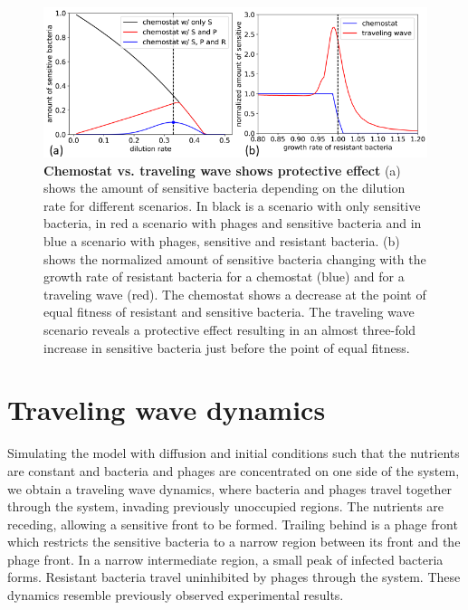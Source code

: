 \begin{figure}
\centering
\includegraphics[width=\linewidth]{graphics/2025_09_26_phages_fig2.png}
\caption{\textbf{Chemostat vs. traveling wave shows protective effect} (a) shows the amount of sensitive bacteria depending on the dilution rate for different scenarios. In black is a scenario with only sensitive bacteria, in red a scenario with phages and sensitive bacteria and in blue a scenario with phages, sensitive and resistant bacteria. (b) shows the normalized amount of sensitive bacteria changing with the growth rate of resistant bacteria for a chemostat (blue) and for a traveling wave (red). The chemostat shows a decrease at the point of equal fitness of resistant and sensitive bacteria. The traveling wave scenario reveals a protective effect resulting in an almost three-fold increase in sensitive bacteria just before the point of equal fitness.}
\label{fig:results_chemostat_traveling_wave}
\end{figure}

\section{Traveling wave dynamics}
Simulating the model with diffusion and initial conditions such that the nutrients are constant and bacteria and phages are concentrated on one side of the system, we obtain a traveling wave dynamics, where bacteria and phages travel together through the system, invading previously unoccupied regions. The nutrients are receding, allowing a sensitive front to be formed. Trailing behind is a phage front which restricts the sensitive bacteria to a narrow region between its front and the phage front. In a narrow intermediate region, a small peak of infected bacteria forms. Resistant bacteria travel uninhibited by phages through the system. These dynamics resemble previously observed experimental results. 

